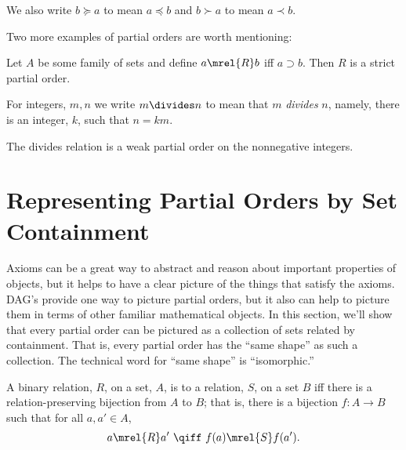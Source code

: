 \begin{definition}
\begin{editingnotes}

We also write $b \succeq a$ to
mean $a \preceq b$ and $b \succ a$ to mean $a \prec b$.

\end{editingnotes}

Two more examples of partial orders are worth mentioning:

\begin{example}\label{supset}
Let $A$ be some family of sets and define $a \mrel{R} b$ iff $a
\supset b$.  Then $R$ is a strict partial order.
\end{example}

For integers, $m,n$ we write $m \divides n$ to mean that $m$
\emph{divides} $n$, namely, there is an integer, $k$, such that $n=km$.

\begin{example}\label{divides}
The divides relation is a weak partial order on the nonnegative integers.
\end{example}

\section{Representing Partial Orders by Set Containment}\label{poset-as-sets_sec}

Axioms can be a great way to abstract and reason about important
properties of objects, but it helps to have a clear picture of the
things that satisfy the axioms.  DAG's provide one way to picture
partial orders, but it also can help to picture them in terms of other
familiar mathematical objects.  In this section, we'll show that every
partial order can be pictured as a collection of sets related by
containment.  That is, every partial order has the ``same shape'' as
such a collection.  The technical word for ``same shape'' is
``isomorphic.''

\begin{definition}\label{relation-isomorphism}
  A binary relation, $R$, on a set, $A$, is
   to a relation, $S$, on a set $B$ iff there is a
  relation-preserving bijection from $A$ to $B$; that is, there is
  a bijection $f:A \to B$ such that for all $a,a' \in A$,
  \[
  a \mrel{R} a'\ \qiff\ f(a) \mrel{S} f(a').
  \]
\end{definition}


\end{definition}
